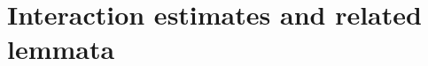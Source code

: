 \documentclass[11pt,letterpaper,reqno]{amsart}
\theoremstyle{plain}%
\newtheorem{lemma}[theorem]{Lemma}
\theoremstyle{definition}
\numberwithin{equation}{section}
\numberwithin{figure}{section}
\begin{document}
\section{Interaction estimates and related lemmata}\label{sec interest}


\end{document}
